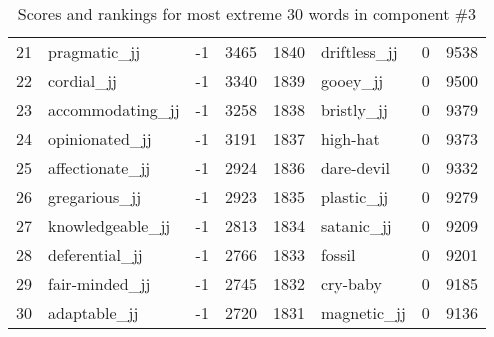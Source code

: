 \begin{table}[tbp]
\begin{tabular}{| rlr@{.}l | rlr@{.}l |}
    21 & pragmatic\_jj & -1 & 3465    &    1840 & driftless\_jj & 0 & 9538 \\
    22 & cordial\_jj & -1 & 3340    &    1839 & gooey\_jj & 0 & 9500 \\
    23 & accommodating\_jj & -1 & 3258    &    1838 & bristly\_jj & 0 & 9379 \\
    24 & opinionated\_jj & -1 & 3191    &    1837 & high-hat & 0 & 9373 \\
    25 & affectionate\_jj & -1 & 2924    &    1836 & dare-devil & 0 & 9332 \\
    26 & gregarious\_jj & -1 & 2923    &    1835 & plastic\_jj & 0 & 9279 \\
    27 & knowledgeable\_jj & -1 & 2813    &    1834 & satanic\_jj & 0 & 9209 \\
    28 & deferential\_jj & -1 & 2766    &    1833 & fossil & 0 & 9201 \\
    29 & fair-minded\_jj & -1 & 2745    &    1832 & cry-baby & 0 & 9185 \\
    30 & adaptable\_jj & -1 & 2720    &    1831 & magnetic\_jj & 0 & 9136 \\
    \hline
    \end{tabular}
    \caption{Scores and rankings for most extreme 30 words in component \#3} 
\end{table}
\clearpage
